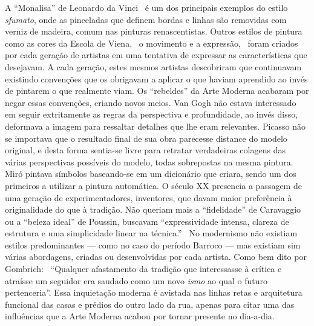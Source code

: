 A ``Monalisa'' de Leonardo da Vinci~\cite{pegus, hall} é um dos
principais exemplos do estilo \textit{sfumato}, onde as pinceladas que
definem bordas e linhas são removidas com verniz de madeira, comum nas
pinturas renascentistas. Outros estilos de pintura como as cores da
Escola de Viena,~\cite{gardner} o movimento e a
expressão,~\cite{gombrich, gordon} foram criados por cada geração de
artistas em uma tentativa de expressar as características que
desejavam. A cada geração, estes mesmos artistas descobriram que
continuavam existindo convenções que os obrigavam a aplicar o que
haviam aprendido ao invés de pintarem o que realmente viam. Os
``rebeldes'' da Arte Moderna acabaram por negar essas convenções,
criando novos meios. Van Gogh não estava interessado em seguir
extritamente as regras da perspectiva e profundidade, ao invés disso,
deformava a imagem para ressaltar detalhes que lhe eram
relevantes. Picasso não se importava que o resultado final de sua obra
parecesse distance do modelo original, e desta forma sentia-se livre
para retratar verdadeiras colagens das várias perspectivas possíveis
do modelo, todas sobrepostas na mesma pintura. Miró pintava símbolos
baseando-se em um dicionário que criara, sendo um dos primeiros a
utilizar a pintura automática. O século XX presencia a passagem de uma
geração de experimentadores, inventores, que davam maior preferência à
originalidade do que à tradição. Não queriam mais a ``fidelidade'' de
Caravaggio ou a ``beleza ideal'' de Poussin, buscavam ``expressividade
intensa, clareza de estrutura e uma simplicidade linear na
técnica.''~\cite{gombrich} No modernismo não existiam estilos
predominantes --- como no caso do período Barroco --- mas existiam sim
várias abordagens, criadas ou desenvolvidas por cada artista. Como bem
dito por Gombrich:~\cite{gombrich} ``Qualquer afastamento da tradição que
interessasse à crítica e atraísse um seguidor era saudado como um novo
\emph{ismo} ao qual o futuro pertenceria''. Essa inquietação moderna é
avistada nas linhas retas e arquitetura funcional das casas e prédios
do outro lado da rua, apenas para citar uma das influências que a Arte
Moderna acabou por tornar presente no dia-a-dia.

